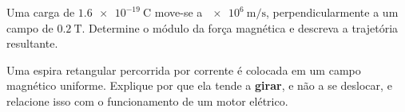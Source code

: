 \blocoaplicacao
\begin{questao}[2]{}

Uma carga de $\SI{1.6e-19}{\coulomb}$ move-se a
$\SI{e6}{\meter\per\second}$, perpendicularmente a um campo de $\SI{0.2}{\tesla}$.
Determine o módulo da força magnética e descreva a trajetória resultante.


\end{questao}
\begin{questao}[2]{}

Uma espira retangular percorrida por corrente é colocada em um campo magnético
uniforme. Explique por que ela tende a \textbf{girar}, e não a se deslocar, e
relacione isso com o funcionamento de um motor elétrico.


\end{questao}

